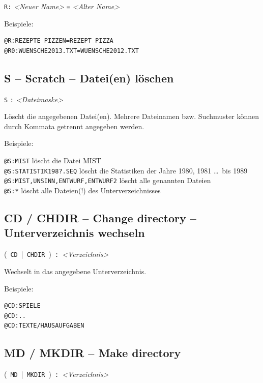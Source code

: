 \documentclass[10pt,a4paper]{scrartcl}		%
\begin{document}
\texttt{R} \texttt{:}
\textit{<Neuer Name>} \texttt{=} \textit{<Alter Name>}

Beispiele:
\begin{verbatim}
@R:REZEPTE PIZZEN=REZEPT PIZZA
@R0:WUENSCHE2013.TXT=WUENSCHE2012.TXT
\end{verbatim}

\subsection{S -- Scratch -- Datei(en) löschen}
\texttt{S}  \texttt{:}
\textit{<Dateimaske>} \Big[ \texttt{,} \ldots \  \Big]

Löscht die angegebenen Datei(en). Mehrere Dateinamen bzw. Suchmuster
können durch Kommata getrennt angegeben werden.

Beispiele:

\texttt{@S:MIST} löscht die Datei MIST\\
\texttt{@S:STATISTIK198?.SEQ} löscht die Statistiken der Jahre 1980, 1981 
\ldots \ bis 1989 \\
\texttt{@S:MIST,UNSINN,ENTWURF,ENTWURF2} löscht alle genannten Dateien \\
\texttt{@S:*} löscht alle Dateien(!) des Unterverzeichnisses

\subsection{CD / CHDIR -- Change directory -- Unterverzeichnis wechseln}
\mbox{\Big( \texttt{CD} \Big| \texttt{CHDIR} \Big) 
\texttt{:} \textit{<Verzeichnis>}}

Wechselt in das angegebene Unterverzeichnis.

Beispiele:
\begin{verbatim}
@CD:SPIELE
@CD:..
@CD:TEXTE/HAUSAUFGABEN
\end{verbatim}

\subsection{MD / MKDIR -- Make directory}

\mbox{\Big( \texttt{MD} \Big| \texttt{MKDIR} \Big) 
\texttt{:} \textit{<Verzeichnis>}}
\end{document}

